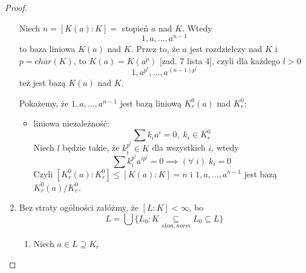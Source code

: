 \begin{proof}
\begin{enumerate}[leftmargin=*]
    Niech $n=[K(a):K]=$ stopień $a$ nad $K$. Wtedy
    $$1,a,...,a^{n-1}$$
    to baza liniowa $K(a)$ nad $K$. Przez to, że $a$ jest rozdzielczy nad $K$ i $p=char(K)$, to $K(a)=K(a^p)$ [zad. 7 lista 4], czyli dla każdego $l>0$
    $$1,a^{p^l},...,a^{(n-1)p^l}$$
    też jest bazą $K(a)$ nad $K$.

    Pokażemy, że $1,a,...,a^{n-1}$ jest bazą liniową $K_r^0(a)$ nad $K_r^0$:
    \begin{itemize}
        \item liniowa niezależność:
        $$\sum k_ia^i=0,\;k_i\in K_r^0$$
        Niech $l$ będzie takie, że $k_i^{p^l}\in K$ dla wszystkich $i$, wtedy
        $$\sum k_i^{p^l}a^{ip^l}=0\implies (\forall\;i)\;k_i=0$$
        Czyli $[K_r^0(a):K_r^0]\leq[K(a):K]=n$ i $1,a,...,a^{n-1}$ jest bazą $K_r^0(a)/K_r^0$.
    \end{itemize}
    \item Bez straty ogólności załóżmy, że $[L:K]<\infty$, bo 
    $$L=\bigcup\{L_0:K\underset{skon,norm}{\subseteq} L_0\subseteq L\}$$
    \begin{enumerate}
        \item Niech $a\in L\supseteq K_r$
    \end{enumerate}
\end{enumerate}

\end{proof}
























